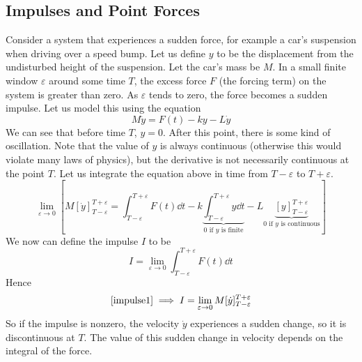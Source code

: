 \subsection{Impulses and Point Forces}
Consider a system that experiences a sudden force, for example a car's suspension when driving over a speed bump. Let us define \(y\) to be the displacement from the undisturbed height of the suspension. Let the car's mass be \(M\). In a small finite window \(\varepsilon\) around some time \(T\), the excess force \(F\) (the forcing term) on the system is greater than zero. As \(\varepsilon\) tends to zero, the force becomes a sudden impulse. Let us model this using the equation
\[ M\ddot y = F(t) - ky - L\dot y \]
We can see that before time \(T\), \(y=0\). After this point, there is some kind of oscillation. Note that the value of \(y\) is always continuous (otherwise this would violate many laws of physics), but the derivative is not necessarily continuous at the point \(T\). Let us integrate the equation above in time from \(T - \varepsilon\) to \(T + \varepsilon\).
\begin{equation}\label{impulse1}
	\lim_{\varepsilon \to 0} \left[ M[\dot y]_{T - \varepsilon}^{T + \varepsilon} = \int_{T - \varepsilon}^{T + \varepsilon} F(t) \dd{t} - k \underbrace{\int_{T - \varepsilon}^{T + \varepsilon} y \dd{t}}_{0\text{ if \(y\) is finite}} - L\underbrace{[y]_{T - \varepsilon}^{T + \varepsilon}}_{0\text{ if \(y\) is continuous}} \right]
\end{equation}
We now can define the impulse \(I\) to be
\[ I = \lim_{\varepsilon \to 0} \int_{T - \varepsilon}^{T + \varepsilon} F(t) \dd{t} \]
Hence
\[ \eqref{impulse1} \implies I = \lim_{\varepsilon \to 0} M[\dot y]_{T - \varepsilon}^{T + \varepsilon} \]
So if the impulse is nonzero, the velocity \(\dot y\) experiences a sudden change, so it is discontinuous at \(T\). The value of this sudden change in velocity depends on the integral of the force.
